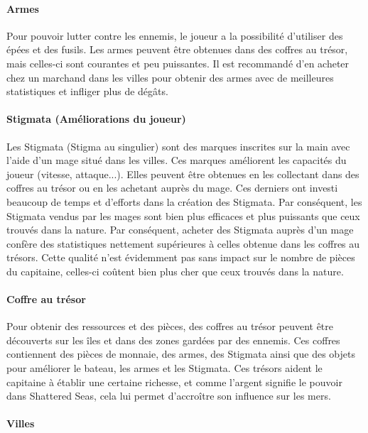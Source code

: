 \documentclass{article}
\begin{document}
\paragraph{Armes}\hfill

Pour pouvoir lutter contre les ennemis, le joueur a la possibilité d'utiliser des épées et des fusils. Les armes peuvent être obtenues dans des coffres au trésor, mais celles-ci sont courantes et peu puissantes. Il est recommandé d’en acheter chez un marchand dans les villes pour obtenir des armes avec de meilleures statistiques et infliger plus de dégâts.

\paragraph{Stigmata (Améliorations du joueur)}\hfill

Les Stigmata (Stigma au singulier) sont des marques inscrites sur la main avec l'aide d'un mage situé dans les villes. Ces marques améliorent les capacités du joueur (vitesse, attaque...). Elles peuvent être obtenues en les collectant dans des coffres au trésor ou en les achetant auprès du mage. Ces derniers ont investi beaucoup de temps et d’efforts dans la création des Stigmata. Par conséquent, les Stigmata vendus par les mages sont bien plus efficaces et plus puissants que ceux trouvés dans la nature. Par conséquent, acheter des Stigmata auprès d’un mage confère des statistiques nettement supérieures à celles obtenue dans les coffres au trésors. Cette qualité n'est évidemment pas sans impact sur le nombre de pièces du capitaine, celles-ci coûtent bien plus cher que ceux trouvés dans la nature.

\paragraph{Coffre au trésor}\hfill

Pour obtenir des ressources et des pièces, des coffres au trésor peuvent être découverts sur les îles et dans des zones gardées par des ennemis. Ces coffres contiennent des pièces de monnaie, des armes, des Stigmata ainsi que des objets pour améliorer le bateau, les armes et les Stigmata. Ces trésors aident le capitaine à établir une certaine richesse, et comme l'argent signifie le pouvoir dans Shattered Seas, cela lui permet d’accroître son influence sur les mers.

\paragraph{Villes}\hfill
\end{document}
